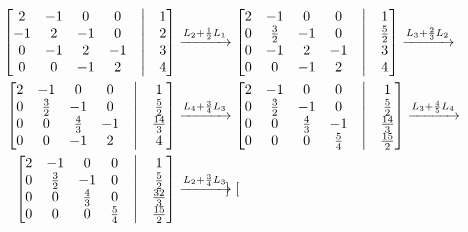 \documentclass[leqno]{article}
\begin{document}
\begin{enumerate}
    \begin{align*}
    \begin{bmatrix}
    2 & -1 & 0 & 0 & \bigm| & 1\\
    -1 & 2 & -1 & 0 & \bigm| & 2\\
    0 & -1 & 2 & -1 & \bigm| & 3\\
    0 & 0 & -1 & 2 & \bigm| & 4\\
    \end{bmatrix}&\xrightarrow{L_2+\frac{1}{2}L_1}\begin{bmatrix}
    2 & -1 & 0 & 0 & \bigm| & 1\\
    0 & \frac{3}{2} & -1 & 0 & \bigm| & \frac{5}{2}\\
    0 & -1 & 2 & -1 & \bigm| & 3\\
    0 & 0 & -1 & 2 & \bigm| & 4\\
    \end{bmatrix}\xrightarrow{L_3+\frac{2}{3}L_2}\\
    \begin{bmatrix}
    2 & -1 & 0 & 0 & \bigm| & 1\\
    0 & \frac{3}{2} & -1 & 0 & \bigm| & \frac{5}{2}\\
    0 & 0 & \frac{4}{3} & -1 & \bigm| & \frac{14}{3}\\
    0 & 0 & -1 & 2 & \bigm| & 4\\
    \end{bmatrix}&\xrightarrow{L_4+\frac{3}{4}L_3}\begin{bmatrix}
    2 & -1 & 0 & 0 & \bigm| & 1\\
    0 & \frac{3}{2} & -1 & 0 & \bigm| & \frac{5}{2}\\
    0 & 0 & \frac{4}{3} & -1 & \bigm| & \frac{14}{3}\\
    0 & 0 & 0 & \frac{5}{4} & \bigm| & \frac{15}{2}\\
    \end{bmatrix}\xrightarrow{L_3+\frac{4}{5}L_4}\\
    \begin{bmatrix}
    2 & -1 & 0 & 0 & \bigm| & 1\\
    0 & \frac{3}{2} & -1 & 0 & \bigm| & \frac{5}{2}\\
    0 & 0 & \frac{4}{3} & 0 & \bigm| & \frac{32}{3}\\
    0 & 0 & 0 & \frac{5}{4} & \bigm| & \frac{15}{2}\\
    \end{bmatrix}&\xrightarrow{L_2+\frac{3}{4}L_3}\begin{bmatrix}

\end{bmatrix}
\end{align*}
\end{enumerate}
\end{document}
